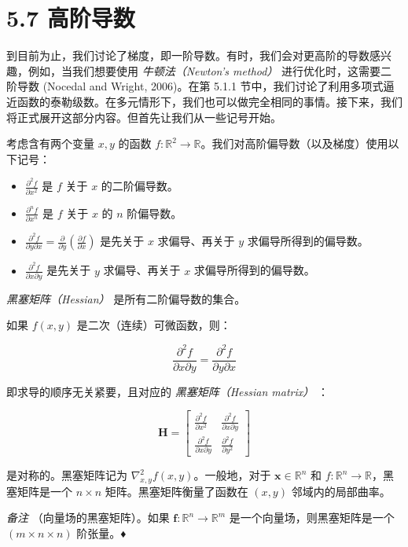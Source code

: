 \section*{5.7 高阶导数}
\label{sec:5.7}

到目前为止，我们讨论了梯度，即一阶导数。有时，我们会对更高阶的导数感兴趣，例如，当我们想要使用 \emph{牛顿法（Newton's method）} 进行优化时，这需要二阶导数 (Nocedal and Wright, 2006)。在第 5.1.1 节中，我们讨论了利用多项式逼近函数的泰勒级数。在多元情形下，我们也可以做完全相同的事情。接下来，我们将正式展开这部分内容。但首先让我们从一些记号开始。

考虑含有两个变量 $ x, y $ 的函数 $ f : \mathbb{R}^2 \to \mathbb{R} $。我们对高阶偏导数（以及梯度）使用以下记号：

\begin{itemize}
\item $ \frac{\partial^2 f}{\partial x^2} $ 是 $ f $ 关于 $ x $ 的二阶偏导数。
\item $ \frac{\partial^n f}{\partial x^n} $ 是 $ f $ 关于 $ x $ 的 $ n $ 阶偏导数。
\item $ \frac{\partial^2 f}{\partial y \partial x} = \frac{\partial}{\partial y} \left( \frac{\partial f}{\partial x} \right) $ 是先关于 $ x $ 求偏导、再关于 $ y $ 求偏导所得到的偏导数。
\item $ \frac{\partial^2 f}{\partial x \partial y} $ 是先关于 $ y $ 求偏导、再关于 $ x $ 求偏导所得到的偏导数。
\end{itemize}

\emph{黑塞矩阵（Hessian）} 是所有二阶偏导数的集合。

如果 $ f(x, y) $ 是二次（连续）可微函数，则：

\begin{equation}
\frac{\partial^2 f}{\partial x \partial y} = \frac{\partial^2 f}{\partial y \partial x}
\tag{5.146}\label{eq:5-146}
\end{equation}

即求导的顺序无关紧要，且对应的 \emph{黑塞矩阵（Hessian matrix）} ：

\begin{equation}
\boldsymbol{H} = \begin{bmatrix} \frac{\partial^2 f}{\partial x^2} & \frac{\partial^2 f}{\partial x \partial y} \\ \frac{\partial^2 f}{\partial x \partial y} & \frac{\partial^2 f}{\partial y^2} \end{bmatrix}
\tag{5.147}\label{eq:5-147}
\end{equation}

是对称的。黑塞矩阵记为 $ \nabla_{x,y}^2 f(x, y) $。一般地，对于 $ \boldsymbol{x} \in \mathbb{R}^n $ 和 $ f : \mathbb{R}^n \to \mathbb{R} $，黑塞矩阵是一个 $ n \times n $ 矩阵。黑塞矩阵衡量了函数在 $ (x, y) $ 邻域内的局部曲率。

\emph{备注} （向量场的黑塞矩阵）。如果 $ \boldsymbol{f} : \mathbb{R}^n \to \mathbb{R}^m $ 是一个向量场，则黑塞矩阵是一个 $ (m \times n \times n) $ 阶张量。♦
